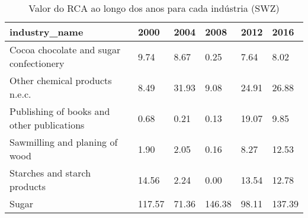 \begin{table}
\centering
\caption{Valor do RCA ao longo dos anos para cada indústria (SWZ)}
\begin{tabular}{p{6cm}p{1.5cm}p{1.5cm}p{1.5cm}p{1.5cm}p{1.5cm}}
\toprule
                             industry\_name &   2000 &  2004 &   2008 &  2012 &   2016 \\
\midrule
   Cocoa chocolate and sugar confectionery &   9.74 &  8.67 &   0.25 &  7.64 &   8.02 \\
            Other chemical products n.e.c. &   8.49 & 31.93 &   9.08 & 24.91 &  26.88 \\
Publishing of books and other publications &   0.68 &  0.21 &   0.13 & 19.07 &   9.85 \\
            Sawmilling and planing of wood &   1.90 &  2.05 &   0.16 &  8.27 &  12.53 \\
              Starches and starch products &  14.56 &  2.24 &   0.00 & 13.54 &  12.78 \\
                                     Sugar & 117.57 & 71.36 & 146.38 & 98.11 & 137.39 \\
\bottomrule
\end{tabular}
\end{table}
